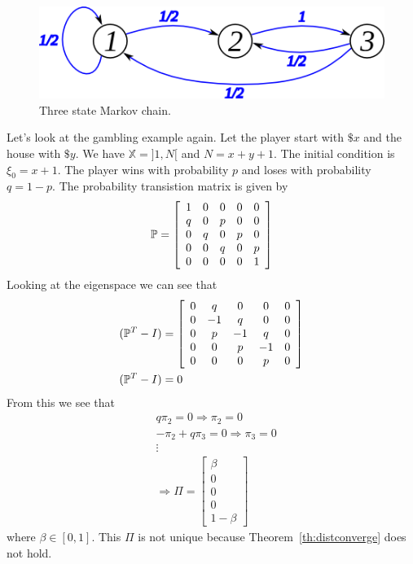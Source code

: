 \begin{figure}[ht!]
\centering
\includegraphics[width=.4\textwidth]{images/10mc3b}
\caption{Three state Markov chain.}
\label{fig:10mc3b}
\end{figure}

\begin{example}
\label{ex:gambling}
Let's look at the gambling example again.
Let the player start with $\$x$ and the house with $\$y$.
We have $\mathbb{X}=]1,N[$ and $N=x+y+1$.%
The initial condition is $\xi_0=x+1$.
The player wins with probability $p$ and loses with probability $q=1-p$.
The probability transistion matrix is given by
$$\mathbb{P} = \left[\begin{array}{c c c c c} 1 & 0 & 0 & 0 & 0 \\ q & 0 & p & 0 & 0 \\ 0 & q & 0 & p & 0 \\ 0 & 0 & q & 0 & p \\ 0 & 0 & 0 & 0 & 1 \end{array}\right]$$
Looking at the eigenspace we can see that
\begin{align*}
&(\mathbb{P}^T-I) = \left[\begin{array}{c c c c c} 0 & q & 0 & 0 & 0 \\ 0 & -1 & q & 0 & 0 \\ 0 & p & -1 & q & 0 \\ 0 & 0 & p & -1 & 0 \\ 0 & 0 & 0 & p & 0 \end{array}\right] \\
& (\mathbb{P}^T-I) = 0
\end{align*}
From this we see that
\begin{align*}
&q\pi_2 = 0 \Rightarrow \pi_2=0 \\
&-\pi_2+q\pi_3 = 0 \Rightarrow \pi_3=0 \\
&\vdots \\
&\Rightarrow \Pi = \left[\begin{array}{c} \beta \\ 0 \\ 0 \\ 0 \\ 1-\beta \end{array}\right]
\end{align*}
where $\beta\in[0,1]$.
This $\Pi$ is not unique because Theorem~\ref{th:distconverge} does not hold.

\end{example}
